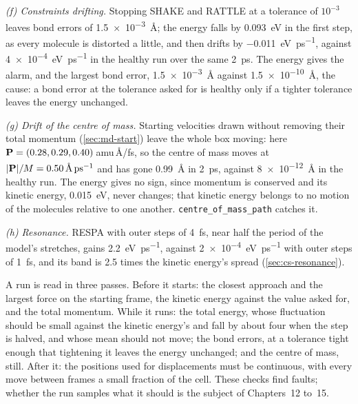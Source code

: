 \emph{(f) Constraints drifting.} Stopping SHAKE and RATTLE at a tolerance
of $10^{-3}$ leaves bond errors of \SI{1.5e-3}{\angstrom}; the energy falls
by \SI{0.093}{\electronvolt} in the first step, as every molecule is
distorted a little, and then drifts by
\SI{-0.011}{\electronvolt\per\pico\second}, against
\SI{4e-4}{\electronvolt\per\pico\second} in the healthy run over the same
\SI{2}{\pico\second}. The energy gives the alarm, and the largest bond
error, \SI{1.5e-3}{\angstrom} against \SI{1.5e-10}{\angstrom}, the cause: a
bond error at the tolerance asked for is healthy only if a tighter
tolerance leaves the energy unchanged.

\emph{(g) Drift of the centre of mass.} Starting velocities drawn without
removing their total momentum (\cref{sec:md-start}) leave the whole box
moving: here $\bm{\mathrm{P}} = (0.28, 0.29, 0.40)$\,amu\,\AA/fs, so the centre of
mass moves at $\lvert\vb{P}\rvert/M = \SI{0.50}{\angstrom\per\pico\second}$
and has gone \SI{0.99}{\angstrom} in \SI{2}{\pico\second}, against
\SI{8e-12}{\angstrom} in the healthy run. The energy gives no sign, since
momentum is conserved and its kinetic energy, \SI{0.015}{\electronvolt},
never changes; that kinetic energy belongs to no motion of the molecules
relative to one another. \texttt{centre\_of\_mass\_path} catches it.

\emph{(h) Resonance.} RESPA with outer steps of \SI{4}{\femto\second},
near half the period of the model's stretches, gains
\SI{2.2}{\electronvolt\per\pico\second}, against
\SI{2e-4}{\electronvolt\per\pico\second} with outer steps of
\SI{1}{\femto\second}, and its band is 2.5 times the kinetic energy's
spread (\cref{sec:cs-resonance}).

\begin{practice}
A run is read in three passes. Before it starts: the closest approach and
the largest force on the starting frame, the kinetic energy against the
value asked for, and the total momentum. While it runs: the total energy,
whose fluctuation should be small against the kinetic energy's and fall
by about four when the step is halved, and whose mean should not move;
the bond errors, at a tolerance tight enough that tightening it leaves
the energy unchanged; and the centre of mass, still. After it: the
positions used for displacements must be continuous, with every move
between frames a small fraction of the cell. These checks find faults;
whether the run samples what it should is the subject of Chapters~12
to~15.
\end{practice}

